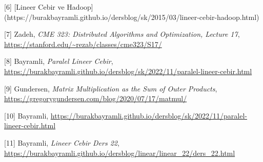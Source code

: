 \documentclass[12pt,fleqn]{article}\usepackage{../../common}
\begin{document}
[6] [Lineer Cebir ve Hadoop](https://burakbayramli.github.io/dersblog/sk/2015/03/lineer-cebir-hadoop.html)

[7] Zadeh, {\em CME 323: Distributed Algorithms and Optimization, Lecture 17},
    \url{https://stanford.edu/~rezab/classes/cme323/S17/}

[8] Bayramli, {\em Paralel Lineer Cebir},
    \url{https://burakbayramli.github.io/dersblog/sk/2022/11/paralel-lineer-cebir.html}

[9] Gundersen, {\em Matrix Multiplication as the Sum of Outer Products},
    \url{https://gregorygundersen.com/blog/2020/07/17/matmul/}

[10] Bayramli, \url{https://burakbayramli.github.io/dersblog/sk/2022/11/paralel-lineer-cebir.html}

[11] Bayramli, {\em Lineer Cebir Ders 22},
     \url{https://burakbayramli.github.io/dersblog/linear/linear_22/ders_22.html}
\end{document}
